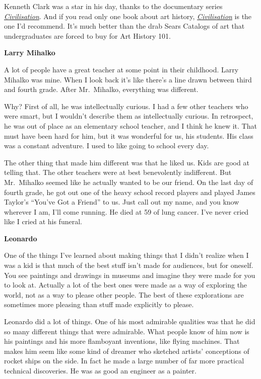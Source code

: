 \documentclass[12pt]{book}
\begin{document}
Kenneth Clark was a star in his day, thanks to the documentary series
\href{http://www.amazon.com/dp/B000F0UUKA}{\emph{Civilisation}}. And if
you read only one book about art history,
\href{http://www.abebooks.com/servlet/SearchResults?an=clark&sts=t&tn=civilisation}{\emph{Civilisation}}
is the one I'd recommend. It's much better than the drab Sears Catalogs
of art that undergraduates are forced to buy for Art History 101.

\textbf{Larry Mihalko}

A lot of people have a great teacher at some point in their childhood.
Larry Mihalko was mine. When I look back it's like there's a line drawn
between third and fourth grade. After Mr.~Mihalko, everything was
different.

Why? First of all, he was intellectually curious. I had a few other
teachers who were smart, but I wouldn't describe them as intellectually
curious. In retrospect, he was out of place as an elementary school
teacher, and I think he knew it. That must have been hard for him, but
it was wonderful for us, his students. His class was a constant
adventure. I used to like going to school every day.

The other thing that made him different was that he liked us. Kids are
good at telling that. The other teachers were at best benevolently
indifferent. But Mr.~Mihalko seemed like he actually wanted to be our
friend. On the last day of fourth grade, he got out one of the heavy
school record players and played James Taylor's ``You've Got a Friend''
to us. Just call out my name, and you know wherever I am, I'll come
running. He died at 59 of lung cancer. I've never cried like I cried at
his funeral.

\textbf{Leonardo}

One of the things I've learned about making things that I didn't realize
when I was a kid is that much of the best stuff isn't made for
audiences, but for oneself. You see paintings and drawings in museums
and imagine they were made for you to look at. Actually a lot of the
best ones were made as a way of exploring the world, not as a way to
please other people. The best of these explorations are sometimes more
pleasing than stuff made explicitly to please.

Leonardo did a lot of things. One of his most admirable qualities was
that he did so many different things that were admirable. What people
know of him now is his paintings and his more flamboyant inventions,
like flying machines. That makes him seem like some kind of dreamer who
sketched artists' conceptions of rocket ships on the side. In fact he
made a large number of far more practical technical discoveries. He was
as good an engineer as a painter.
\end{document}
